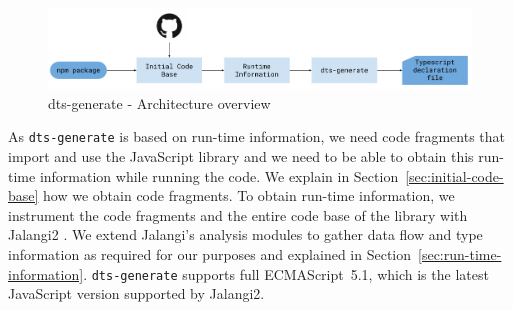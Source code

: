 \documentclass[sigplan,screen]{acmart}
\newcommand{\figref}[1]{Figure~\ref{#1}}
\begin{document}

\begin{figure}[tp]
  \centering
  \includegraphics[width=1\linewidth]{dts-generate-block-diagram.pdf}
  \caption[dts-generate - Architecture overview]{dts-generate - Architecture
    overview
  } 
  \label{fig:tsd_generation_method_block_diagram}
\end{figure}

As \texttt{dts-generate} is based on run-time information, we need code
fragments that import and use the JavaScript library and we need to be
able to obtain this run-time information while running the code.
We explain in Section~\ref{sec:initial-code-base} how we obtain code
fragments. 
To obtain run-time information, we instrument
the code fragments and the entire code base of the library with
Jalangi2 \cite{DBLP:conf/sigsoft/SenKBG13}. We extend Jalangi's
analysis modules to gather data flow and type information as required
for our purposes and explained in
Section~\ref{sec:run-time-information}.
\texttt{dts-generate} supports full ECMAScript~5.1, which is
the latest JavaScript version supported by Jalangi2. 
\end{document}
